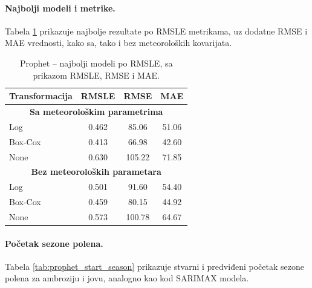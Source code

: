 \documentclass[12pt]{article}
\begin{document}
\paragraph{\textbf{Najbolji modeli i metrike.}}
Tabela \ref{tab:prophet_best_models} prikazuje najbolje rezultate po RMSLE metrikama, uz dodatne RMSE i MAE vrednosti, kako sa, tako i bez meteoroloških kovarijata.  

\begin{table}[h!]
\centering
\caption{Prophet – najbolji modeli po RMSLE, sa prikazom RMSLE, RMSE i MAE.}
\label{tab:prophet_best_models}
\renewcommand{\arraystretch}{1.2}
\begin{tabular}{|l|c|c|c|}
\hline
\textbf{Transformacija} & \textbf{RMSLE} & \textbf{RMSE} & \textbf{MAE} \\ \hline
\multicolumn{4}{|c|}{\textbf{Sa meteorološkim parametrima}} \\ \hline
Log      & 0.462  & 85.06 & 51.06 \\ \hline
Box-Cox  & 0.413  & 66.98 & 42.60 \\ \hline
None     & 0.630  & 105.22 & 71.85 \\ \hline
\multicolumn{4}{|c|}{\textbf{Bez meteoroloških parametara}} \\ \hline
Log      & 0.501  & 91.60 & 54.40 \\ \hline
Box-Cox  & 0.459  & 80.15 & 44.92 \\ \hline
None     & 0.573  & 100.78 & 64.67 \\ \hline
\end{tabular}
\end{table}


\paragraph{\textbf{Početak sezone polena.}}  
Tabela \ref{tab:prophet_start_season} prikazuje stvarni i predviđeni početak sezone polena za ambroziju i jovu, analogno kao kod SARIMAX modela.  
\end{document}
